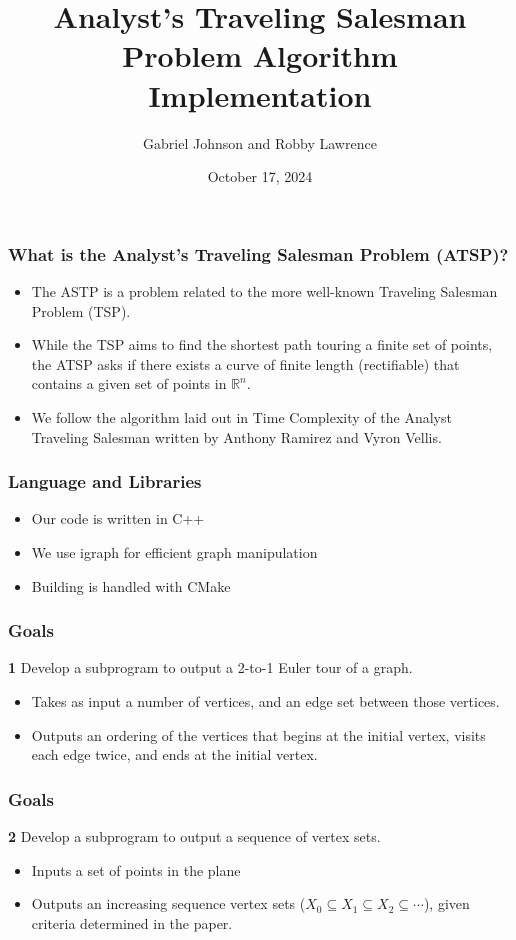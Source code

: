 \documentclass{beamer}
\title{Analyst’s Traveling Salesman Problem Algorithm Implementation}
\author{Gabriel Johnson and Robby Lawrence}
\date{October 17, 2024}
\begin{document}
\frame{\titlepage}

\begin{frame}
\frametitle{What is the Analyst’s Traveling Salesman Problem (ATSP)?}
\begin{itemize}
    \item The ASTP is a problem related to the more well-known
    Traveling Salesman Problem (TSP).
    \item While the TSP aims to find the shortest path touring a finite set of points, the ATSP asks if there exists a curve of finite length (rectifiable) that contains a given set of points in $\mathbb{R}^n$.
    \item We follow the algorithm laid out in Time Complexity of the Analyst Traveling Salesman written by Anthony Ramirez and Vyron Vellis.
\end{itemize}
\end{frame}

\begin{frame}
\frametitle{Language and Libraries}
    \begin{itemize}
        \item Our code is written in C++
        \item We use igraph for efficient graph manipulation
        \item Building is handled with CMake
    \end{itemize}
\end{frame}

\begin{frame}
\frametitle{Goals}
    \textbf{1} Develop a subprogram to output a 2-to-1 Euler tour of a graph.
    \begin{itemize}
        \item Takes as input a number of vertices, and an edge set between those vertices.
        \item Outputs an ordering of the vertices that begins at the initial vertex, visits each edge twice, and ends at the initial vertex.
    \end{itemize}
\end{frame}

\begin{frame}
    \frametitle{Goals}
    \textbf{2} Develop a subprogram to output a sequence of vertex sets.
    \begin{itemize}
        \item Inputs a set of points in the plane
        \item Outputs an increasing sequence vertex sets ($X_0 \subseteq X_1 \subseteq X_2 \subseteq \cdots$), given criteria determined in the paper.
    \end{itemize}
\end{frame}
\end{document}
